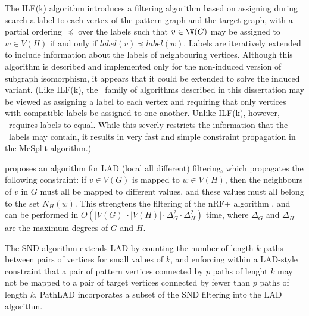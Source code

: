 The ILF(k) algorithm \citep{DBLP:journals/constraints/ZampelliDS10} introduces a
filtering algorithm based on assigning during search a label to each vertex of
the pattern graph and the target graph, with a partial ordering $\preccurlyeq$
over the labels such that $v \in \V(G)$ may be assigned to $w \in V(H)$ if and
only if $\mathit{label}(v) \preccurlyeq \mathit{label}(w)$.  Labels are
iteratively extended to include information about the labels of neighbouring
vertices.  Although this algorithm is described and implemented only for the
non-induced version of subgraph isomorphism, it appears that it could be
extended to solve the induced variant.  (Like ILF(k), the \McSplit\ family of
algorithms described in this dissertation may be viewed as assigning a label to
each vertex and requiring that only vertices with compatible labels be assigned
to one another. Unlike ILF(k), however, \McSplit\ requires labels to equal.
While this severly restricts the information that the \McSplit\ labels may
contain, it results in very fast and simple constraint propagation in the
McSplit algorithm.)

\citet{DBLP:journals/ai/Solnon10} proposes an algorithm for LAD (local all
different) filtering, which propagates the following constraint: if $v \in
V(G)$ is mapped to $w \in V(H)$, then the neighbours of $v$ in $G$ must all be
mapped to different values, and these values must all belong to the set
$N_H(w)$.  This strengtens the filtering of the nRF+ algorithm
\citep{DBLP:journals/mscs/LarrosaV02}, and can be performed in $O(|V(G)| \cdot
|V(H)| \cdot \Delta_G^2 \cdot \Delta_H^2)$ time, where $\Delta_G$ and
$\Delta_H$ are the maximum degrees of $G$ and $H$.

The SND algorithm \citep{DBLP:conf/cp/AudemardLMGP14} extends LAD by counting
the number of length-$k$ paths between pairs of vertices for small values of
$k$, and enforcing within a LAD-style constraint that a pair of pattern
vertices connected by $p$ paths of lenght $k$ may not be mapped to a pair of
target vertices connected by fewer than $p$ paths of length $k$.  PathLAD
\citep{DBLP:conf/lion/KotthoffMS16} incorporates a subset of the SND filtering
into the LAD algorithm.

